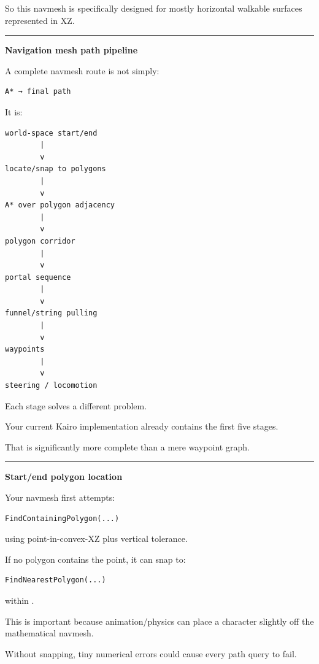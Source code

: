 So this navmesh is specifically designed for mostly horizontal walkable surfaces represented in XZ.

\begin{center}\rule{0.5\linewidth}{0.5pt}\end{center}

\textbf{Navigation mesh path pipeline}

A complete navmesh route is not simply:

\begin{verbatim}
A* → final path
\end{verbatim}

It is:

\begin{verbatim}
world-space start/end
        |
        v
locate/snap to polygons
        |
        v
A* over polygon adjacency
        |
        v
polygon corridor
        |
        v
portal sequence
        |
        v
funnel/string pulling
        |
        v
waypoints
        |
        v
steering / locomotion
\end{verbatim}

Each stage solves a different problem.

Your current Kairo implementation already contains the first five stages.

That is significantly more complete than a mere waypoint graph.

\begin{center}\rule{0.5\linewidth}{0.5pt}\end{center}

\textbf{Start/end polygon location}

Your navmesh first attempts:

\begin{verbatim}
FindContainingPolygon(...)
\end{verbatim}

using point-in-convex-XZ plus vertical tolerance.

If no polygon contains the point, it can snap to:

\begin{verbatim}
FindNearestPolygon(...)
\end{verbatim}

within .

This is important because animation/physics can place a character slightly off the mathematical navmesh.

Without snapping, tiny numerical errors could cause every path query to fail.

